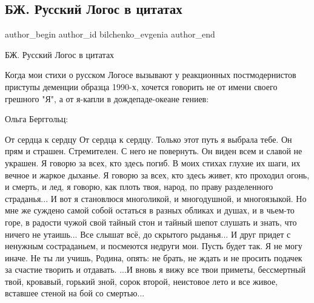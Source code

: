  
 
 
 
 
 
\subsection{БЖ. Русский Логос в цитатах}
\label{sec:18_11_2021.fb.bilchenko_evgenia.3.russkij_logos_citaty}
 
\ifcmt
 author_begin
   author_id bilchenko_evgenia
 author_end
\fi

БЖ. Русский Логос в цитатах

Когда мои стихи о русском Логосе вызывают у реакционных постмодернистов
приступы деменции образца 1990-х, хочется говорить не от имени своего грешного
"Я", а от я-капли в дождепаде-океане гениев:

Ольга Берггольц:

\begin{multicols}{2}
\obeycr
От сердца к сердцу
От сердца к сердцу. Только этот путь
я выбрала тебе. Он прям и страшен.
\smallskip
Стремителен. С него не повернуть.
Он виден всем и славой не украшен.
Я говорю за всех, кто здесь погиб.
В моих стихах глухие их шаги,
их вечное и жаркое дыханье.
\smallskip
Я говорю за всех, кто здесь живет,
кто проходил огонь, и смерть, и лед,
я говорю, как плоть твоя, народ,
по праву разделенного страданья...
И вот я становлюся многоликой,
и многодушной, и многоязыкой.
\smallskip
Но мне же суждено самой собой
остаться в разных обликах и душах,
и в чьем-то горе, в радости чужой
свой тайный стон и тайный шепот слушать
и знать, что ничего не утаишь...
\smallskip
Все слышат всё, до скрытого рыданья...
И друг придет с ненужным состраданьем,
и посмеются недруги мои.
\smallskip
Пусть будет так. Я не могу иначе.
Не ты ли учишь, Родина, опять:
не брать, не ждать и не просить подачек
за счастие творить и отдавать.
\smallskip
...И вновь я вижу все твои приметы,
бессмертный твой, кровавый, горький зной,
сорок второй, неистовое лето
и все живое, вставшее стеной
на бой со смертью...
\restorecr
\end{multicols}


